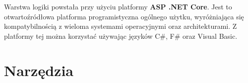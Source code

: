 Warstwa logiki powstała przy użyciu platformy \textbf{ASP .NET Core}. Jest to otwartoźródłowa platforma programistyczna ogólnego użytku, wyróżniająca się kompatybilnością z wieloma systemami operacyjnymi oraz architekturami. Z platformy tej można korzystać używając języków C\#, F\# oraz Visual Basic.

\section{Narzędzia}

